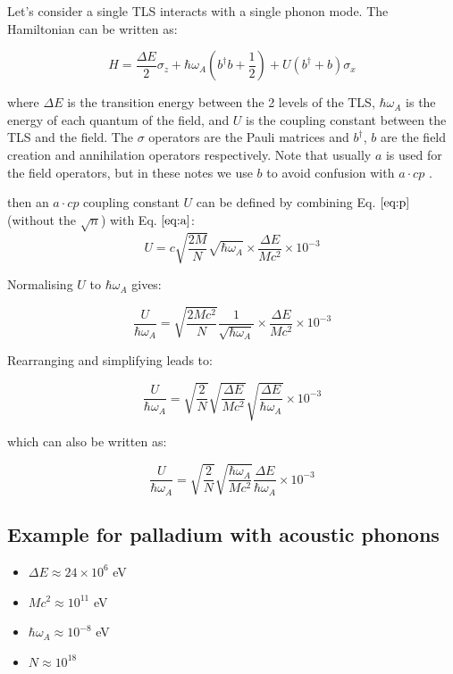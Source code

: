 \documentclass[
]{article}
\renewcommand{\[}{\begin{equation}}
\renewcommand{\]}{\end{equation}}
\providecommand{\tightlist}{%
  \setlength{\itemsep}{0pt}\setlength{\parskip}{0pt}}
\begin{document}
Let's consider a single TLS interacts with a single phonon mode. The
Hamiltonian can be written as:

\[
H = \frac{\Delta E}{2} \sigma_z + \hbar\omega_A\left(b^{\dagger}b +\frac{1}{2}\right) + U\left( b^{\dagger} + b \right)\sigma_x
\]

where \(\Delta E\) is the transition energy between the 2 levels of the
TLS, \(\hbar\omega_A\) is the energy of each quantum of the field, and
\(U\) is the coupling constant between the TLS and the field. The
\(\sigma\) operators are the Pauli matrices and \(b^{\dagger}\), \(b\)
are the field creation and annihilation operators respectively. Note
that usually \(a\) is used for the field operators, but in these notes
we use \(b\) to avoid confusion with \(a \cdot cp\) .

then an \(a \cdot cp\) coupling constant \(U\) can be defined by
combining Eq. \(\ref{eq:p}\) (without the \(\sqrt{n}\)) with Eq.
\(\ref{eq:a}\): \[
U = c \sqrt{\frac{2M}{N}} \sqrt{\hbar \omega_A} \times \frac{\Delta E}{M c^2} \times 10^{-3}
\]

Normalising \(U\) to \(\hbar \omega_A\) gives:

\[
\frac{U}{\hbar \omega_A} = \sqrt{\frac{2M c^2}{N}} \frac{1}{\sqrt{\hbar \omega_A}} \times \frac{\Delta E}{M c^2} \times 10^{-3}
\]

Rearranging and simplifying leads to:

\[
\frac{U}{\hbar \omega_A} = \sqrt{\frac{2}{N}} \sqrt{\frac{\Delta E}{M c^2}} \sqrt{\frac{\Delta E}{\hbar \omega_A}} \times 10^{-3}
\]

which can also be written as:

\[
\frac{U}{\hbar \omega_A} = \sqrt{\frac{2}{N}} \sqrt{\frac{\hbar \omega_A}{M c^2}} \frac{\Delta E}{\hbar \omega_A} \times 10^{-3}
\]

\subsection{Example for palladium with acoustic
phonons}\label{example-for-palladium-with-acoustic-phonons}

\begin{itemize}
\tightlist
\item
  \(\Delta E \approx 24 \times 10^{6}\) eV\\
\item
  \(M c^2 \approx 10^{11}\) eV\\
\item
  \(\hbar \omega_A \approx 10^{-8}\) eV\\
\item
  \(N \approx 10^{18}\)
\end{itemize}
\end{document}
